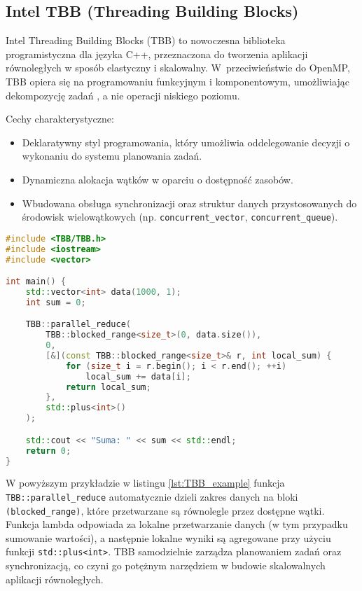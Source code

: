 \subsection{Intel TBB (Threading Building Blocks)}
Intel Threading Building Blocks (TBB) to nowoczesna biblioteka programistyczna dla języka C++, przeznaczona do tworzenia aplikacji równoległych w sposób elastyczny i skalowalny. W~przeciwieństwie do OpenMP, TBB opiera się na programowaniu funkcyjnym i komponentowym, umożliwiając dekompozycję zadań , a nie operacji niskiego poziomu.

Cechy charakterystyczne:
\begin{itemize}
    \item Deklaratywny styl programowania, który umożliwia oddelegowanie decyzji o wykonaniu do systemu planowania zadań.
    \item Dynamiczna alokacja wątków w oparciu o dostępność zasobów.
    \item Wbudowana obsługa synchronizacji oraz struktur danych przystosowanych do środowisk wielowątkowych (np. \texttt{concurrent\_vector}, \texttt{concurrent\_queue}).
\end{itemize}

\begin{lstlisting}[language=C++, caption={Przykład użycia Intel TBB w C++}, label={lst:TBB_example}]
#include <TBB/TBB.h>
#include <iostream>
#include <vector>

int main() {
    std::vector<int> data(1000, 1);
    int sum = 0;

    TBB::parallel_reduce(
        TBB::blocked_range<size_t>(0, data.size()),
        0,
        [&](const TBB::blocked_range<size_t>& r, int local_sum) {
            for (size_t i = r.begin(); i < r.end(); ++i)
                local_sum += data[i];
            return local_sum;
        },
        std::plus<int>()
    );

    std::cout << "Suma: " << sum << std::endl;
    return 0;
}
\end{lstlisting}
W powyższym przykładzie w listingu \ref{lst:TBB_example} funkcja \texttt{TBB::parallel\_reduce} automatycznie dzieli zakres danych na bloki \texttt{(blocked\_range)}, które przetwarzane są równolegle przez dostępne wątki. Funkcja lambda odpowiada za lokalne przetwarzanie danych (w tym przypadku sumowanie wartości), a następnie lokalne wyniki są agregowane przy użyciu funkcji \texttt{std::plus<int>}. TBB samodzielnie zarządza planowaniem zadań oraz synchronizacją, co czyni go potężnym narzędziem w budowie skalowalnych aplikacji równoległych.

